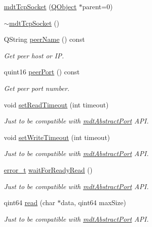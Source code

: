 \begin{DoxyCompactItemize}
\item 
\hyperlink{classmdt_tcp_socket_aeed1a50725a8e61f86de2bf67a92feb8}{mdt\-Tcp\-Socket} (\hyperlink{class_q_object}{Q\-Object} $\ast$parent=0)
\item 
\hyperlink{classmdt_tcp_socket_ac1e7831d297471d6e5b920de5e9bb675}{$\sim$mdt\-Tcp\-Socket} ()
\item 
Q\-String \hyperlink{classmdt_tcp_socket_a1ce96231767c56f8108a8e977987e10f}{peer\-Name} () const 
\begin{DoxyCompactList}\small\item\em Get peer host or I\-P. \end{DoxyCompactList}\item 
quint16 \hyperlink{classmdt_tcp_socket_a2a6c3e034ca51a2f45ec136b864ba9a3}{peer\-Port} () const 
\begin{DoxyCompactList}\small\item\em Get peer port number. \end{DoxyCompactList}\item 
void \hyperlink{classmdt_tcp_socket_aae23057f2e0ee326d0fee78ffe3f00f9}{set\-Read\-Timeout} (int timeout)
\begin{DoxyCompactList}\small\item\em Just to be compatible with \hyperlink{classmdt_abstract_port}{mdt\-Abstract\-Port} A\-P\-I. \end{DoxyCompactList}\item 
void \hyperlink{classmdt_tcp_socket_ac59d2dfdf405b5382f0f20d5b9f75fd0}{set\-Write\-Timeout} (int timeout)
\begin{DoxyCompactList}\small\item\em Just to be compatible with \hyperlink{classmdt_abstract_port}{mdt\-Abstract\-Port} A\-P\-I. \end{DoxyCompactList}\item 
\hyperlink{classmdt_abstract_port_ad4121bb930c95887e77f8bafa065a85e}{error\-\_\-t} \hyperlink{classmdt_tcp_socket_adb09186cdacdac15291523c59f156cd4}{wait\-For\-Ready\-Read} ()
\begin{DoxyCompactList}\small\item\em Just to be compatible with \hyperlink{classmdt_abstract_port}{mdt\-Abstract\-Port} A\-P\-I. \end{DoxyCompactList}\item 
qint64 \hyperlink{classmdt_tcp_socket_a78842bc5ddcac2d96fb368ee575214cd}{read} (char $\ast$data, qint64 max\-Size)
\begin{DoxyCompactList}\small\item\em Just to be compatible with \hyperlink{classmdt_abstract_port}{mdt\-Abstract\-Port} A\-P\-I. \end{DoxyCompactList}\item 

\end{DoxyCompactItemize}
